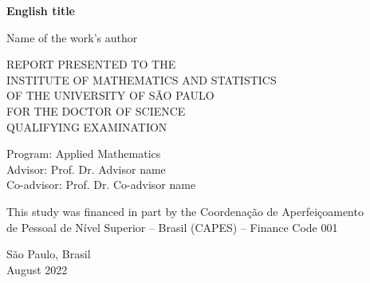 \documentclass[11pt,oneside,a4paper]{book}
\newcommand{\autor}{Name of the work's author}
\newcommand{\tituloen}{English title}
\newcommand{\orientador}{Prof. Dr. Advisor name}
\newcommand{\coorientador}{Prof. Dr. Co-advisor name}
\begin{document}

%

\begin{titlepage}
\begin{center}
\begin{minipage}[t][56mm][s]{96mm}
          \vspace*{2cm plus 1.5cm minus 1.8cm}

          \centering

          {\Large \bfseries\tituloen}\\[0.4cm] %

          \vspace{1cm plus 1cm minus 0.6cm}

          {\Large\autor}

          \vspace*{2cm plus 1.5cm minus 1.8cm}
      \end{minipage}

\vfill


    \textsc{\large{
    REPORT PRESENTED TO THE\\
    INSTITUTE OF MATHEMATICS AND STATISTICS\\
    OF THE UNIVERSITY OF SÃO PAULO\\
    FOR THE DOCTOR OF SCIENCE\\
    QUALIFYING EXAMINATION}}
    
    \vskip 1.5cm
    \large{
    Program: Applied Mathematics\\
    Advisor: \orientador\\
    Co-advisor: \coorientador}

   	\vfill
    \normalsize{This study was financed in part by the Coordenação de
         Aperfeiçoamento\\ de Pessoal de Nível Superior -- Brasil
         (CAPES) -- Finance Code 001}
    
    \vskip 1.5cm
    \normalsize{São Paulo, Brasil}\\
    \normalsize{August 2022}
\end{center}
\end{titlepage}
\end{document}
